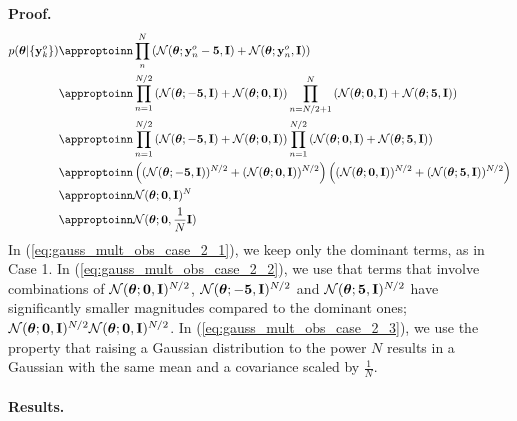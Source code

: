 \textbf{Proof.}
\begin{align}
  p(\thb|\{\data_k\}) 
  &\appropto \prod_n^{N} \left ( \mathcal{N}(\thb; \data_n - \mathbf{5}, \mathbf{I}) + \mathcal{N}( \thb; \data_n, \mathbf{I}) \right ) \\
  &\appropto \prod_{n=1}^{N/2} \left ( \mathcal{N}(\thb; - \mathbf{5}, \mathbf{I}) + \mathcal{N}( \thb; \mathbf{0}, \mathbf{I}) \right ) \prod_{n=N/2 + 1}^{N} \left ( \mathcal{N}(\thb; \mathbf{0}, \mathbf{I}) + \mathcal{N}( \thb; \mathbf{5}, \mathbf{I}) \right )  \\
  &\appropto \prod_{n=1}^{N/2} \left ( \mathcal{N}(\thb; - \mathbf{5}, \mathbf{I}) + \mathcal{N}( \thb; \mathbf{0}, \mathbf{I}) \right ) \prod_{n=1}^{N/2} \left ( \mathcal{N}(\thb; \mathbf{0}, \mathbf{I}) + \mathcal{N}( \thb; \mathbf{5}, \mathbf{I}) \right )  \\
  &\appropto \left ( ( \mathcal{N}(\thb; - \mathbf{5}, \mathbf{I}) )^{N/2} + ( \mathcal{N}( \thb; \mathbf{0}, \mathbf{I}) )^{N/2} \right ) \left ( ( \mathcal{N}(\thb; \mathbf{0}, \mathbf{I}) )^{N/2} + ( \mathcal{N}( \thb; \mathbf{5}, \mathbf{I}) )^{N/2} \right ) \label{eq:gauss_mult_obs_case_2_1} \\
  &\appropto \mathcal{N}(\thb; \mathbf{0}, \mathbf{I})^N \label{eq:gauss_mult_obs_case_2_2} \\
  &\appropto \mathcal{N}( \thb; \mathbf{0}, \frac{1}{N}\mathbf{I}) \label{eq:gauss_mult_obs_case_2_3}
\end{align}
%
In (\ref{eq:gauss_mult_obs_case_2_1}), we keep only the dominant terms, as in Case 1.
In (\ref{eq:gauss_mult_obs_case_2_2}), we use that terms that involve combinations of \(\mathcal{N}(\boldsymbol{\theta}; \mathbf{0}, \mathbf{I})^{N/2}\), \(\mathcal{N}(\boldsymbol{\theta}; -\mathbf{5}, \mathbf{I})^{N/2}\) and \(\mathcal{N}(\boldsymbol{\theta}; \mathbf{5}, \mathbf{I})^{N/2}\) have significantly smaller magnitudes compared to the dominant ones; \(\mathcal{N}(\boldsymbol{\theta}; \mathbf{0}, \mathbf{I})^{N/2} \mathcal{N}(\boldsymbol{\theta}; \mathbf{0}, \mathbf{I})^{N/2}\).
In (\ref{eq:gauss_mult_obs_case_2_3}), we use the property that raising a Gaussian distribution to the power \(N\) results in a Gaussian with the same mean and a covariance scaled by \(\frac{1}{N}\).

\paragraph{Results.}

